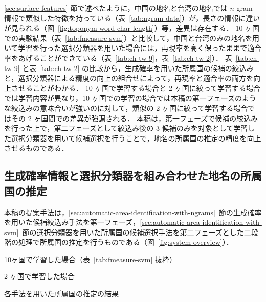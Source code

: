 \documentclass[japanese]{jnlp_1.4}
\begin{document}
\ref{sec:surface-features} 節で述べたように，中国の地名と台湾の地名では $n$-gram 情報で類似した特徴を持っている（表~\ref{tab:ngram-data}）が，長さの情報に違いが見られる（図~\ref{fig:toponym-word-char-length}）等，差異は存在する．
10 ヶ国での実験結果（表~\ref{tab:fmeasure-svm}）と比較して，中国と台湾のみの地名を用いて学習を行った選択分類器を用いた場合には，再現率を高く保ったままで適合率をあげることができている（表~\ref{tab:ch-tw-9}，表~\ref{tab:ch-tw-2}）．
表~\ref{tab:ch-tw-9} と表~\ref{tab:ch-tw-2} の比較から，生成確率を用いた所属国の候補の絞込みと，選択分類器による精度の向上の組合せによって，再現率と適合率の両方を向上させることがわかる．
10 ヶ国で学習する場合と 2 ヶ国に絞って学習する場合では学習内容が異なり，10 ヶ国での学習の場合では本稿の第一フェーズのような絞込みの意味合いが強いのに対して，類似の 2 ヶ国に絞って学習する場合ではその 2 ヶ国間での差異が強調される．
本稿は，第一フェーズで候補の絞込みを行った上で，第二フェーズとして絞込み後の 3 候補のみを対象として学習した選択分類器を用いて候補選択を行うことで，地名の所属国の推定の精度を向上させるものである．


\subsection{生成確率情報と選択分類器を組み合わせた地名の所属国の推定}
\label{sec:consideration-ngrams+svm}

本稿の提案手法は，\ref{sec:automatic-area-identification-with-ngrams}~節の生成確率を用いた候補絞込み手法を第一フェーズ，\ref{sec:automatic-area-identification-with-svm}~節の選択分類器を用いた所属国の候補選択手法を第二フェーズとした二段階の処理で所属国の推定を行うものである（図~\ref{fig:system-overview}）．

\begin{table}[b]
 \begin{minipage}[t]{.45\textwidth}
  \caption{10ヶ国で学習した場合（表~\ref{tab:fmeasure-svm} 抜粋）}
  \label{tab:ch-tw-9}

 \end{minipage}
 
 \hfill
 
 \begin{minipage}[t]{.45\textwidth}
  \caption{2 ヶ国で学習した場合}
  \label{tab:ch-tw-2}

 \end{minipage}
\end{table}
\begin{table}[b]
 \caption{各手法を用いた所属国の推定の結果}
 \label{tab:result-trigram+svm}

\end{table}
\end{document}
